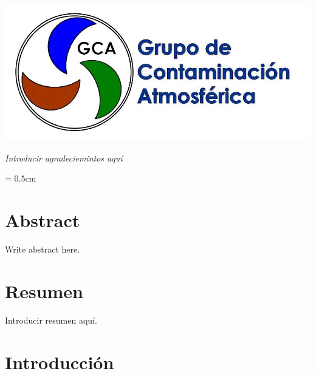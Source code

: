 \documentclass[12pt]{article}
\begin{document}
\begin{minipage}[]{20cm}
\hspace{8.7cm}
\includegraphics[scale=0.4]{logotipo-3-3}
\vspace{7cm}
\end{minipage}


\begin{flushright}
\normalsize \textit{Introducir agradeciemintos aquí}
\end{flushright}

\newpage

\begin{minipage}[]{20cm}
\vspace{10cm}
\end{minipage}

\newpage

\parskip = 0.5cm
\newpage
\tableofcontents
\newpage
{}	%
\setcounter{page}{1}


\section*{Abstract}
%

\normalsize Write abstract here.

\vspace{0.5cm}

\section*{Resumen}

\normalsize Introducir resumen aquí.

\newpage


\section{Introducción}
\end{document}

